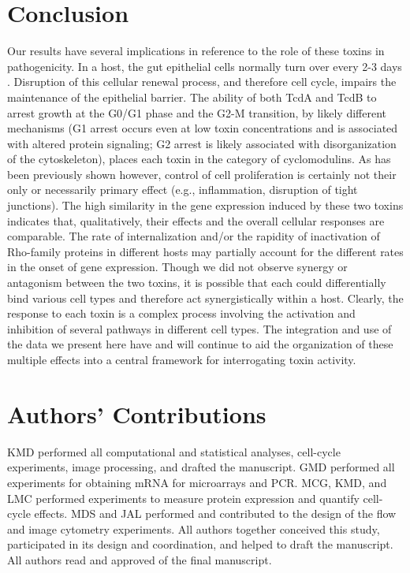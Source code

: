 \section{Conclusion}
Our results have several implications in reference to the role of these toxins in pathogenicity. In a host, the gut epithelial cells normally turn over every 2-3 days \cite{Kim:2010ja}. Disruption of this cellular renewal process, and therefore cell cycle, impairs the maintenance of the epithelial barrier. The ability of both TcdA and TcdB to arrest growth at the G0/G1 phase and the G2-M transition, by likely different mechanisms (G1 arrest occurs even at low toxin concentrations and is associated with altered protein signaling; G2 arrest is likely associated with disorganization of the cytoskeleton), places each toxin in the category of cyclomodulins. As has been previously shown however, control of cell proliferation is certainly not their only or necessarily primary effect (e.g., inflammation, disruption of tight junctions). The high similarity in the gene expression induced by these two toxins indicates that, qualitatively, their effects and the overall cellular responses are comparable. The rate of internalization and/or the rapidity of inactivation of Rho-family proteins in different hosts may partially account for the different rates in the onset of gene expression. Though we did not observe synergy or antagonism between the two toxins, it is possible that each could differentially bind various cell types and therefore act synergistically within a host. Clearly, the response to each toxin is a complex process involving the activation and inhibition of several pathways in different cell types. The integration and use of the data we present here have and will continue to aid the organization of these multiple effects into a central framework for interrogating toxin activity.

\section{Authors' Contributions}
KMD performed all computational and statistical analyses, cell-cycle experiments, image processing, and drafted the manuscript. GMD performed all experiments for obtaining mRNA for microarrays and PCR. MCG, KMD, and LMC performed experiments to measure protein expression and quantify cell-cycle effects. MDS and JAL performed and contributed to the design of the flow and image cytometry experiments. All authors together conceived this study, participated in its design and coordination, and helped to draft the manuscript. All authors read and approved of the final manuscript.

